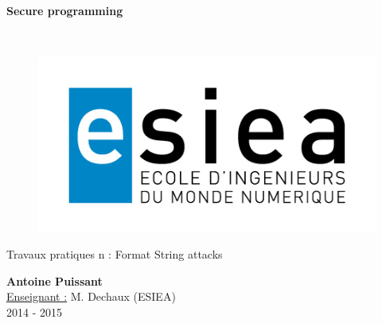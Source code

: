 \begin{titlepage}
      \begin{center}   
        \Huge
        \textbf{Secure programming}
        
        \LARGE
        ~
        
        
        \vfill
        \begin{figure}[H]
	    \centering
	    \begin{minipage}{0.9\textwidth}
		\centering
		\includegraphics[width=\textwidth]{./img/esiea.jpeg}
	    \end{minipage}\hfill
	\end{figure}
        \vfill
        
        \vspace{0.5cm}
        
        Travaux pratiques n : Format String attacks
        
        \vspace{2cm}
        \textbf{Antoine Puissant}\\
        \vspace{0.8cm}
        \Large
        \underline{Enseignant :} M. Dechaux (ESIEA)\\
        \vspace{0.5cm}
        2014 - 2015%
        
    \end{center}
\end{titlepage}